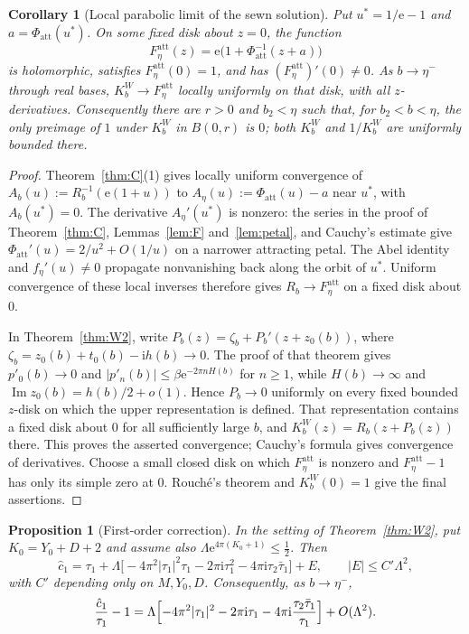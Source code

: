 \documentclass[11pt]{amsart}
\newtheorem{proposition}[theorem]{Proposition}
\newtheorem{corollary}[theorem]{Corollary}
\theoremstyle{definition}
\newcommand{\Rr}{R}
\newcommand{\Kk}{K}
\newcommand{\eee}{\mathrm{e}}
\newcommand{\ii}{\mathrm{i}}
\begin{document}
\begin{corollary}[Local parabolic limit of the sewn solution]
\label{cor:sewn-cusp-local}
Put $u^*=1/\eee-1$ and $a=\Phi_{\mathrm{att}}(u^*)$.  On some fixed disk
about $z=0$, the function
\[
 F_\eta^{\mathrm{att}}(z)
 =\eee\bigl(1+\Phi_{\mathrm{att}}^{-1}(z+a)\bigr)
\]
is holomorphic, satisfies $F_\eta^{\mathrm{att}}(0)=1$, and has
$(F_\eta^{\mathrm{att}})'(0)\ne0$.  As $b\to\eta^-$ through real bases,
$\Kk_b^W\to F_\eta^{\mathrm{att}}$ locally uniformly on that disk,
with all $z$-derivatives.  Consequently there are $r>0$ and $b_2<\eta$
such that, for $b_2<b<\eta$, the only preimage of $1$ under $\Kk_b^W$
in $B(0,r)$ is $0$; both $\Kk_b^W$ and $1/\Kk_b^W$ are uniformly
bounded there.
\end{corollary}

\begin{proof}
Theorem~\ref{thm:C}(1) gives locally uniform convergence of
$A_b(u):=\Rr_b^{-1}(\eee(1+u))$ to
$A_\eta(u):=\Phi_{\mathrm{att}}(u)-a$ near $u^*$, with $A_b(u^*)=0$.
The derivative $A_\eta'(u^*)$ is nonzero: the series in the proof of
Theorem~\ref{thm:C}, Lemmas~\ref{lem:F} and~\ref{lem:petal}, and Cauchy's
estimate give $\Phi_{\mathrm{att}}'(u)=2/u^2+O(1/u)$ on a narrower
attracting petal.  The Abel identity and $f_\eta'(u)\ne0$ propagate
nonvanishing back along the orbit of $u^*$.  Uniform
convergence of these local inverses therefore gives
$\Rr_b\to F_\eta^{\mathrm{att}}$ on a fixed disk about $0$.

In Theorem~\ref{thm:W2}, write
$P_b(z)=\zeta_b+P_b'(z+z_0(b))$, where
$\zeta_b=z_0(b)+t_0(b)-\ii h(b)\to0$.  The proof of that theorem gives
$p'_0(b)\to0$ and $|p'_n(b)|\le\beta\eee^{-2\pi nH(b)}$ for $n\ge1$,
while $H(b)\to\infty$ and $\operatorname{Im}z_0(b)=h(b)/2+o(1)$.
Hence $P_b\to0$ uniformly on every fixed bounded $z$-disk on which
the upper representation is defined.  That representation contains a
fixed disk about $0$ for all sufficiently large $b$, and
$\Kk_b^W(z)=\Rr_b(z+P_b(z))$ there.  This proves the asserted convergence;
Cauchy's formula gives convergence of derivatives.  Choose a small
closed disk on which $F_\eta^{\mathrm{att}}$ is nonzero and
$F_\eta^{\mathrm{att}}-1$ has only its simple zero at $0$.
Rouch\'e's theorem and $\Kk_b^W(0)=1$ give the final assertions.
\end{proof}

\begin{proposition}[First-order correction]\label{prop:first-correction}
In the setting of Theorem~\ref{thm:W2}, put $K_0=Y_0+D+2$ and assume also
$\Lambda\eee^{4\pi(K_0+1)}\le\tfrac12$.  Then
\[
 \hat c_1=\tau_1+\Lambda\bigl[-4\pi^2|\tau_1|^2\tau_1-2\pi\ii\tau_1^2
 -4\pi\ii\tau_2\bar\tau_1\bigr]+E,\qquad|E|\le C'\Lambda^2,
\]
with $C'$ depending only on $M,Y_0,D$.  Consequently, as $b\to\eta^-$,
\[
 \frac{\hat c_1}{\tau_1}-1=\Lambda\Bigl[-4\pi^2|\tau_1|^2-2\pi\ii\tau_1
 -4\pi\ii\frac{\tau_2\bar\tau_1}{\tau_1}\Bigr]+O(\Lambda^2).
\]
\end{proposition}
\end{document}
